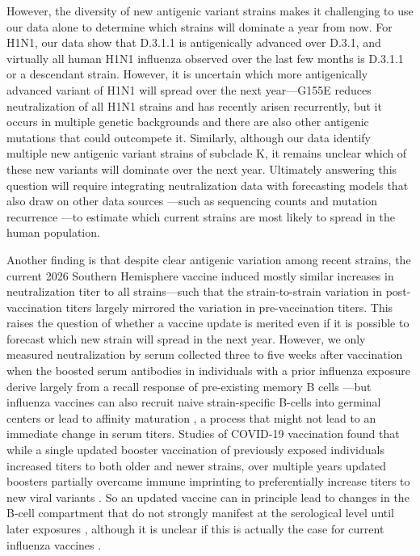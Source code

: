 However, the diversity of new antigenic variant strains makes it challenging to use our data alone to determine which strains will dominate a year from now. For H1N1, our data show that D.3.1.1 is antigenically advanced over D.3.1, and virtually all human H1N1 influenza observed over the last few months is D.3.1.1 or a descendant strain. However, it is uncertain which more antigenically advanced variant of H1N1 will spread over the next year---G155E reduces neutralization of all H1N1 strains and has recently arisen recurrently, but it occurs in multiple genetic backgrounds and there are also other antigenic mutations that could outcompete it. Similarly, although our data identify multiple new antigenic variant strains of subclade K, it remains unclear which of these new variants will dominate over the next year. Ultimately answering this question will require integrating neutralization data with forecasting models that also draw on other data sources \citep{luksza2014,huddleston2020,shi2025,neher2016,chen2026}---such as sequencing counts \citep{abousamra2024} and mutation recurrence \citep{turner2026,bloom2023}---to estimate which current strains are most likely to spread in the human population.

Another finding is that despite clear antigenic variation among recent strains, the current 2026 Southern Hemisphere vaccine induced mostly similar increases in neutralization titer to all strains---such that the strain-to-strain variation in post-vaccination titers largely mirrored the variation in pre-vaccination titers. This raises the question of whether a vaccine update is merited even if it is possible to forecast which new strain will spread in the next year. However, we only measured neutralization by serum collected three to five weeks after vaccination when the boosted serum antibodies in individuals with a prior influenza exposure derive largely from a recall response of pre-existing memory B cells \citep{wrammert2008,andrews2015,ellebedy2016}---but influenza vaccines can also recruit naive strain-specific B-cells into germinal centers or lead to affinity maturation \citep{ellebedy2020,turner2020,matz2026,mcintire2024,hoehn2021}, a process that might not lead to an immediate change in serum titers. Studies of COVID-19 vaccination found that while a single updated booster vaccination of previously exposed individuals increased titers to both older and newer strains, over multiple years updated boosters partially overcame immune imprinting to preferentially increase titers to new viral variants \citep{yisimayi2024,mellis2026,tortorici2026,alsoussi2023}. So an updated vaccine can in principle lead to changes in the B-cell compartment that do not strongly manifest at the serological level until later exposures \citep{schiepers2023,yisimayi2024}, although it is unclear if this is actually the case for current influenza vaccines \citep{davis2020,spangler2025}.

